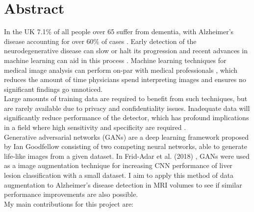 \documentclass[
    author={Kai Hulme},
    supervisor={Dr Jon Bird},
    degree={BSc},
    title={Generative Adversarial Networks as an Augmentation Technique},
    subtitle={for Alzheimer's Disease Detection in MRI Volumes},
    type={Research},
    year={2021} 
]{dissertation}
\begin{document}

\maketitle
\frontmatter
\makedecl
\tableofcontents
\listoffigures
\listoftables
\lstlistoflistings


\chapter*{Abstract}

In the UK 7.1\% of all people over 65 suffer from dementia, with Alzheimer's disease accounting for over 60\% of cases \cite{prince2014dementia}. Early detection of the neurodegenerative disease can slow or halt its progression \cite{weller2018current} and recent advances in machine learning can aid in this process \cite{tanveer2020machine}. Machine learning techniques for medical image analysis can perform on-par with medical professionals \cite{liu2019comparison}, which reduces the amount of time physicians spend interpreting images and ensures no significant findings go unnoticed.
\\

Large amounts of training data are required to benefit from such techniques, but are rarely available due to privacy and confidentiality issues. Inadequate data will significantly reduce performance of the detector, which has profound implications in a field where high sensitivity and specificity are required \cite{cho2015much}.
\\

Generative adversarial networks (GANs) are a deep learning framework proposed by Ian Goodfellow \cite{goodfellow2014generative} consisting of two competing neural networks, able to generate life-like images from a given dataset. In Frid-Adar et al. (2018) \cite{frid2018gan}, GANs were used as a image augmentation technique for increasing CNN performance of liver lesion classification with a small dataset. I aim to apply this method of data augmentation to Alzheimer's disease detection in MRI volumes to see if similar performance improvements are also possible.
\\

\noindent
My main contributions for this project are:
\end{document}
